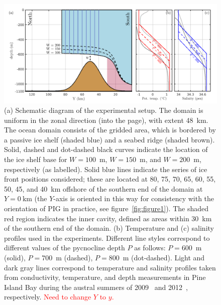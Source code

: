 \documentclass[draft]{agujournal2019}
\newcommand{\red}[1]{\textcolor{red}{#1}}
\begin{document}
\begin{figure}
    \centering
    \includegraphics[width = \textwidth]{../make_figures/plots/figure2.pdf}
    \caption{(a) Schematic diagram of the experimental setup. The domain is uniform in the zonal direction (into the page), with extent 48~km. The ocean domain consists of the gridded area, which is bordered by a passive ice shelf (shaded blue) and a seabed ridge (shaded brown). Solid, dashed and dot-dashed black curves indicate the location of the ice shelf base for $W=100$~m, $W=150$~m, and $W=200$~m, respectively (as labelled). Solid blue lines indicate the series of ice front positions considered; these are located at 80, 75, 70, 65, 60, 55, 50, 45, and 40~km offshore of the southern end of the domain at $Y = 0~\text{km}$ (the $Y$-axis is oriented in this way for consistency with the orientation of PIG in practice, see figure~\ref{fig:figure1}). The shaded red region indicates the inner cavity, defined as areas within 30~km of the southern end of the domain. (b) Temperature and (c) salinity profiles used in the experiments. Different line styles correspond to different values of the pycnocline depth $P$ as follows: $P=600$~m (solid), $P=700$~m (dashed), $P=800$~m (dot-dashed). Light and dark gray lines correspond to temperature and salinity profiles taken from conductivity, temperature, and depth measurements in Pine Island Bay during the austral summers of 2009~\cite{Jacobs2011NatureGeosci} and 2012~\cite{Dutrieux2014Science}, respectively. \red{Need to change $Y$ to $y$.}}
    \label{fig:figure2}
\end{figure}
\end{document}
